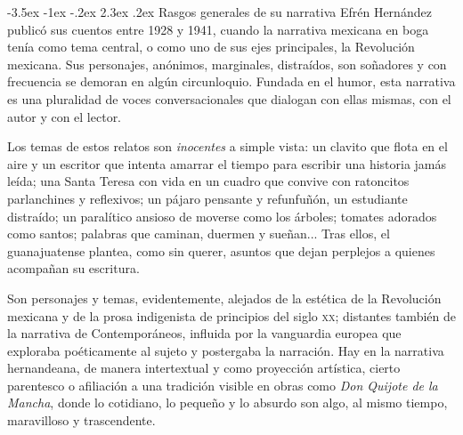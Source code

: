 \documentclass[14pt,twoside,final]{extbook} %
\makeatletter
\renewcommand\section{\@startsection {section}{1}{\z@}%
                                     {-3.5ex \@plus -1ex \@minus -.2ex}%
                                     {2.3ex \@plus .2ex}%
                                     {\normalfont\large\bfseries\sc}}
\makeatother
\begin{document}
\section{Rasgos generales de su narrativa}\label{sec:rasgos-generales-de-su-narrativa}
Efrén Hernández publicó sus cuentos entre 1928 y 1941, cuando la narrativa mexicana en boga tenía como tema central, o como uno de sus ejes principales, la Revolución mexicana. Sus personajes, anónimos, marginales, distraídos, son soñadores y con frecuencia se demoran en algún circunloquio. Fundada en el humor, esta narrativa es una pluralidad de voces conversacionales que dialogan con ellas mismas, con el autor y con el lector.

Los temas de estos relatos son \emph{inocentes} a simple vista: un clavito que flota en el aire y un escritor que intenta amarrar el tiempo para escribir una historia jamás leída; una Santa Teresa con vida en un cuadro que convive con ratoncitos parlanchines y reflexivos; un pájaro pensante y refunfuñón, un estudiante distraído; un paralítico ansioso de moverse como los árboles; tomates adorados como santos; palabras que caminan, duermen y sueñan... Tras ellos, el guanajuatense plantea, como sin querer, asuntos que dejan perplejos a quienes acompañan su escritura.

Son personajes y temas, evidentemente, alejados de la estética de la Revolución mexicana y de la prosa indigenista de principios del siglo \textsc{xx}; distantes también de la narrativa de Contemporáneos, influida por la vanguardia europea que exploraba poéticamente al sujeto y postergaba la narración. Hay en la narrativa hernandeana, de manera intertextual y como proyección artística, cierto parentesco o afiliación a una tradición visible en obras como \emph{Don Quijote de la Mancha}, donde lo cotidiano, lo pequeño y lo absurdo son algo, al mismo tiempo, maravilloso y trascendente.
\end{document}
